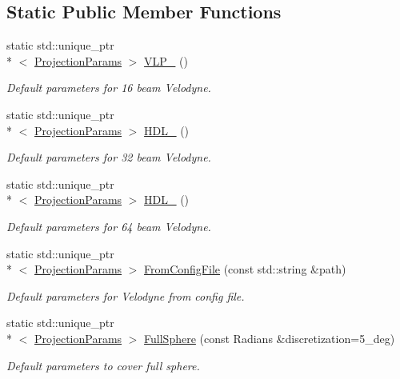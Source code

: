 \subsection*{Static Public Member Functions}
\begin{DoxyCompactItemize}
\item 
static std\-::unique\-\_\-ptr\\*
$<$ \hyperlink{classdepth__clustering_1_1ProjectionParams}{Projection\-Params} $>$ \hyperlink{classdepth__clustering_1_1ProjectionParams_aef7c0d212f6ab8909d0992ed8c19a45d}{V\-L\-P\-\_} ()
\begin{DoxyCompactList}\small\item\em Default parameters for 16 beam Velodyne. \end{DoxyCompactList}\item 
static std\-::unique\-\_\-ptr\\*
$<$ \hyperlink{classdepth__clustering_1_1ProjectionParams}{Projection\-Params} $>$ \hyperlink{classdepth__clustering_1_1ProjectionParams_a38a76a0e0f00f8f1b95b6108641703d6}{H\-D\-L\-\_} ()
\begin{DoxyCompactList}\small\item\em Default parameters for 32 beam Velodyne. \end{DoxyCompactList}\item 
static std\-::unique\-\_\-ptr\\*
$<$ \hyperlink{classdepth__clustering_1_1ProjectionParams}{Projection\-Params} $>$ \hyperlink{classdepth__clustering_1_1ProjectionParams_a40b8a22533ec69811ef4d3d01fb04a85}{H\-D\-L\-\_} ()
\begin{DoxyCompactList}\small\item\em Default parameters for 64 beam Velodyne. \end{DoxyCompactList}\item 
static std\-::unique\-\_\-ptr\\*
$<$ \hyperlink{classdepth__clustering_1_1ProjectionParams}{Projection\-Params} $>$ \hyperlink{classdepth__clustering_1_1ProjectionParams_ad58dde41a515eda5871998da5435dc42}{From\-Config\-File} (const std\-::string \&path)
\begin{DoxyCompactList}\small\item\em Default parameters for Velodyne from config file. \end{DoxyCompactList}\item 
static std\-::unique\-\_\-ptr\\*
$<$ \hyperlink{classdepth__clustering_1_1ProjectionParams}{Projection\-Params} $>$ \hyperlink{classdepth__clustering_1_1ProjectionParams_aa61906911995f0501dd03746b96d4c9c}{Full\-Sphere} (const Radians \&discretization=5\-\_\-deg)
\begin{DoxyCompactList}\small\item\em Default parameters to cover full sphere. \end{DoxyCompactList}\end{DoxyCompactItemize}


